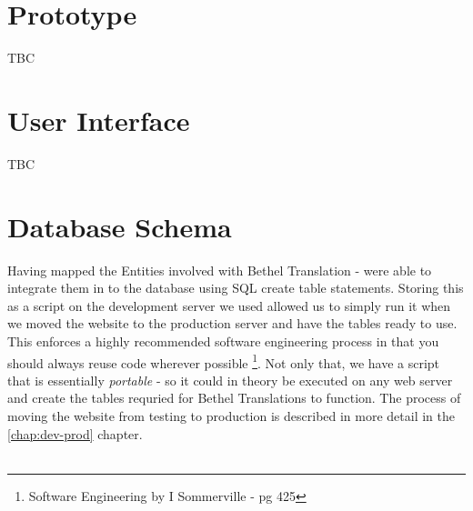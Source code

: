 \documentclass{l3proj}
\begin{document}
\section{Prototype}
\label{sect:proto}
TBC

\section{User Interface}
\label{sect:ui}
TBC

\section{Database Schema}
\label{sect:db-sch}
Having mapped the Entities involved with Bethel Translation -  were able to integrate them in to 
the database using SQL create table statements. Storing this as a script on the development server we used
allowed us to simply run it when we moved the website to the production server and have the tables ready to use.
This enforces a highly recommended software engineering process in that you should always reuse code wherever 
possible \footnote{Software Engineering by I Sommerville - pg 425}. Not only that, we have a script that is essentially
\textit{portable} - so it could in theory be executed on any web server and create the tables requried for
Bethel Translations to function. The process of moving the website from testing to production is described 
in more detail in the \ref{chap:dev-prod} chapter. \\
\\
\end{document}
